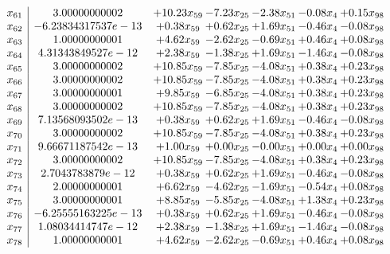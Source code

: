 \documentclass[8pt]{article}
\begin{document}
\[\begin{array}{c| c c@{\hskip 2pt} c@{\hskip 2pt} c@{\hskip 2pt} c@{\hskip 2pt} c@{\hskip 2pt} }
 x_{61}   &  3.00000000002 & + 10.23 x_{59} & -7.23 x_{25} & -2.38 x_{51} & -0.08 x_{4} & +  0.15 x_{98}\\
 x_{62}   &  -6.23834317537e-13 & +  0.38 x_{59} & +  0.62 x_{25} & +  1.69 x_{51} & -0.46 x_{4} & -0.08 x_{98}\\
 x_{63}   &  1.00000000001 & +  4.62 x_{59} & -2.62 x_{25} & -0.69 x_{51} & +  0.46 x_{4} & +  0.08 x_{98}\\
 x_{64}   &  4.31343849527e-12 & +  2.38 x_{59} & -1.38 x_{25} & +  1.69 x_{51} & -1.46 x_{4} & -0.08 x_{98}\\
 x_{65}   &  3.00000000002 & + 10.85 x_{59} & -7.85 x_{25} & -4.08 x_{51} & +  0.38 x_{4} & +  0.23 x_{98}\\
 x_{66}   &  3.00000000002 & + 10.85 x_{59} & -7.85 x_{25} & -4.08 x_{51} & +  0.38 x_{4} & +  0.23 x_{98}\\
 x_{67}   &  3.00000000001 & +  9.85 x_{59} & -6.85 x_{25} & -4.08 x_{51} & +  0.38 x_{4} & +  0.23 x_{98}\\
 x_{68}   &  3.00000000002 & + 10.85 x_{59} & -7.85 x_{25} & -4.08 x_{51} & +  0.38 x_{4} & +  0.23 x_{98}\\
 x_{69}   &  7.13568093502e-13 & +  0.38 x_{59} & +  0.62 x_{25} & +  1.69 x_{51} & -0.46 x_{4} & -0.08 x_{98}\\
 x_{70}   &  3.00000000002 & + 10.85 x_{59} & -7.85 x_{25} & -4.08 x_{51} & +  0.38 x_{4} & +  0.23 x_{98}\\
 x_{71}   &  9.66671187542e-13 & +  1.00 x_{59} & +  0.00 x_{25} & -0.00 x_{51} & +  0.00 x_{4} & +  0.00 x_{98}\\
 x_{72}   &  3.00000000002 & + 10.85 x_{59} & -7.85 x_{25} & -4.08 x_{51} & +  0.38 x_{4} & +  0.23 x_{98}\\
 x_{73}   &  2.7043783879e-12 & +  0.38 x_{59} & +  0.62 x_{25} & +  1.69 x_{51} & -0.46 x_{4} & -0.08 x_{98}\\
 x_{74}   &  2.00000000001 & +  6.62 x_{59} & -4.62 x_{25} & -1.69 x_{51} & -0.54 x_{4} & +  0.08 x_{98}\\
 x_{75}   &  3.00000000001 & +  8.85 x_{59} & -5.85 x_{25} & -4.08 x_{51} & +  1.38 x_{4} & +  0.23 x_{98}\\
 x_{76}   &  -6.25555163225e-13 & +  0.38 x_{59} & +  0.62 x_{25} & +  1.69 x_{51} & -0.46 x_{4} & -0.08 x_{98}\\
 x_{77}   &  1.08034414747e-12 & +  2.38 x_{59} & -1.38 x_{25} & +  1.69 x_{51} & -1.46 x_{4} & -0.08 x_{98}\\
 x_{78}   &  1.00000000001 & +  4.62 x_{59} & -2.62 x_{25} & -0.69 x_{51} & +  0.46 x_{4} & +  0.08 x_{98}\\

\end{array}\]
\end{document}
